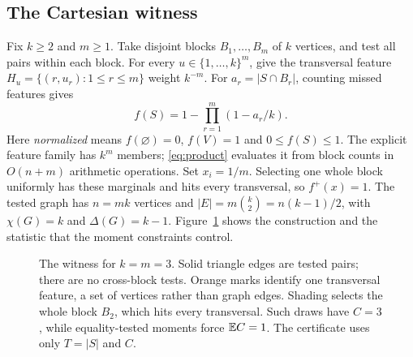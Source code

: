 \subsection{The Cartesian witness}\label{sec:construction}
Fix \(k\geq2\) and \(m\geq1\). Take disjoint blocks \(B_1,\ldots,B_m\)
of \(k\) vertices, and test all pairs within each block. For every
\(u\in\{1,\ldots,k\}^m\), give the transversal feature
\(H_u=\{(r,u_r):1\leq r\leq m\}\) weight \(k^{-m}\).
For \(a_r=|S\cap B_r|\), counting missed features gives
\begin{equation}\label{eq:product}
 f(S)=1-\prod_{r=1}^m(1-a_r/k).
\end{equation}
Here \emph{normalized} means \(f(\varnothing)=0\), \(f(V)=1\) and
\(0\leq f(S)\leq1\). The explicit feature family has \(k^m\) members;
\eqref{eq:product} evaluates it from block counts in \(O(n+m)\) arithmetic
operations. Set \(x_i=1/m\). Selecting one whole block uniformly has
these marginals and hits every transversal, so \(f^+(x)=1\).
The tested graph has \(n=mk\) vertices and
\(|E|=m\binom{k}{2}=n(k-1)/2\), with \(\chi(G)=k\) and
\(\Delta(G)=k-1\). Figure~\ref{fig:construction} shows the construction
and the statistic that the moment constraints control.

\begin{figure}[!htbp]
\centering

\caption{The witness for \(k=m=3\). Solid triangle edges are tested pairs;
there are no cross-block tests. Orange marks identify one transversal
feature, a set of vertices rather than graph edges. Shading selects the
whole block \(B_2\), which hits every transversal. Such draws have
\(C=3\), while equality-tested moments force \(\mathbb E C=1\).
The certificate uses only \(T=|S|\) and \(C\).}
\label{fig:construction}
\end{figure}

